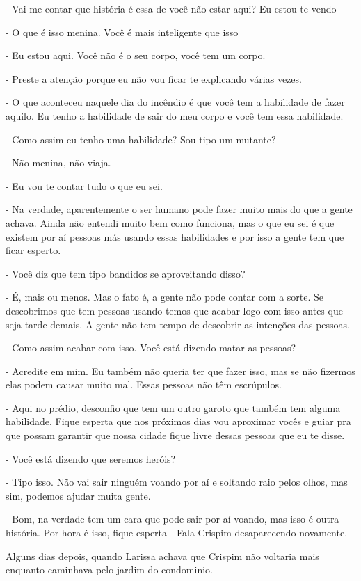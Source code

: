 - Vai me contar que história é essa de você não estar aqui? Eu estou te vendo

- O que é isso menina. Você é mais inteligente que isso

- Eu estou aqui. Você não é o seu corpo, você tem um corpo.

- Preste a atenção porque eu não vou ficar te explicando várias vezes.

- O que aconteceu naquele dia do incêndio é que você tem a habilidade de fazer aquilo. Eu tenho a habilidade de sair do meu corpo e você tem essa habilidade.

- Como assim eu tenho uma habilidade? Sou tipo um mutante?

- Não menina, não viaja.

- Eu vou te contar tudo o que eu sei.

- Na verdade, aparentemente o ser humano pode fazer muito mais do que a gente achava. Ainda não entendi muito bem como funciona, mas o que eu sei é que existem por aí pessoas más usando essas habilidades e por isso a gente tem que ficar esperto.

- Você diz que tem tipo bandidos se aproveitando disso?

- É, mais ou menos. Mas o fato é, a gente não pode contar com a sorte. Se descobrimos que tem pessoas usando temos que acabar logo com isso antes que seja tarde demais. A gente não tem tempo de descobrir as intenções das pessoas.

- Como assim acabar com isso. Você está dizendo matar as pessoas?

- Acredite em mim. Eu também não queria ter que fazer isso, mas se não fizermos elas podem causar muito mal. Essas pessoas não têm escrúpulos.

- Aqui no prédio, desconfio que tem um outro garoto que também tem alguma habilidade. Fique esperta que nos próximos dias vou aproximar vocês e guiar pra que possam garantir que nossa cidade fique livre dessas pessoas que eu te disse.

- Você está dizendo que seremos heróis?

- Tipo isso. Não vai sair ninguém voando por aí e soltando raio pelos olhos, mas sim, podemos ajudar muita gente.

- Bom, na verdade tem um cara que pode sair por aí voando, mas isso é outra história. Por hora é isso, fique esperta - Fala Crispim desaparecendo novamente.

Alguns dias depois, quando Larissa achava que Crispim não voltaria mais enquanto caminhava pelo jardim do condominio.

